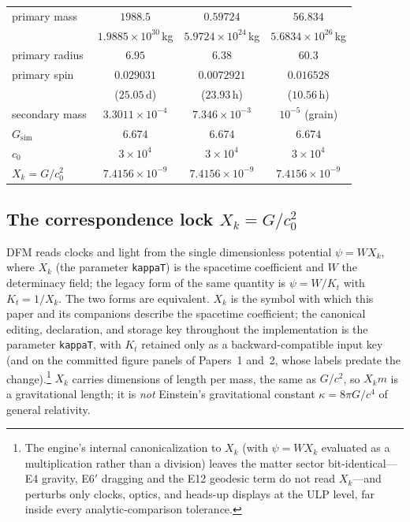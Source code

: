 \documentclass[aps,reprint,amsmath,amssymb,nofootinbib,superscriptaddress,floatfix]{revtex4-2}
\begin{document}
{\begin{table}[t]
\begin{ruledtabular}
\begin{tabular}{lccc}
primary mass & $1988.5$ & $0.59724$ & $56.834$ \\
 & $1.9885{\times}10^{30}$\,kg & $5.9724{\times}10^{24}$\,kg
 & $5.6834{\times}10^{26}$\,kg \\
primary radius & $6.95$ & $6.38$ & $60.3$ \\
primary spin & $0.029031$ & $0.0072921$ & $0.016528$ \\
 & ($25.05$\,d) & ($23.93$\,h) & ($10.56$\,h) \\
secondary mass & $3.3011{\times}10^{-4}$ & $7.346{\times}10^{-3}$
 & $10^{-5}$ (grain) \\
$G_{\mathrm{sim}}$ & $6.674$ & $6.674$ & $6.674$ \\
$c_0$ & $3{\times}10^{4}$ & $3{\times}10^{4}$ & $3{\times}10^{4}$ \\
$X_k=G/c_0^{2}$ & $7.4156{\times}10^{-9}$ & $7.4156{\times}10^{-9}$
 & $7.4156{\times}10^{-9}$ \\
\end{tabular}
\end{ruledtabular}
\end{table}}

\subsection{The correspondence lock
  \texorpdfstring{$X_k=G/c_0^{2}$}{Xk = G/c0\textasciicircum 2}}
\label{sec:physlock}

DFM reads clocks and light from the single dimensionless potential
$\psi = W X_k$, where $X_k$ (the parameter \texttt{kappaT}) is
the spacetime coefficient and $W$ the determinacy field; the legacy
form of the same quantity is $\psi=W/K_t$ with $K_t=1/X_k$.
The two forms are equivalent. $X_k$ is the symbol with which this
paper and its companions describe the spacetime coefficient; the
canonical editing, declaration, and storage key throughout the
implementation is the parameter \texttt{kappaT}, with $K_t$ retained
only as a backward-compatible input key (and on the committed figure
panels of Papers~1 and~2, whose labels predate the change).\footnote{The engine's internal canonicalization to $X_k$
(with $\psi=W X_k$ evaluated as a multiplication rather than a
division) leaves the matter sector bit-identical---E4 gravity,
E6$'$ dragging and the E12 geodesic term do not read $X_k$---and
perturbs only clocks, optics, and heads-up displays at the ULP level,
far inside every analytic-comparison tolerance.}
$X_k$ carries dimensions of length per mass, the same as $G/c^{2}$,
so $X_k m$ is a gravitational length; it is \emph{not} Einstein's
gravitational constant $\kappa=8\pi G/c^{4}$ of general relativity.
\end{document}
